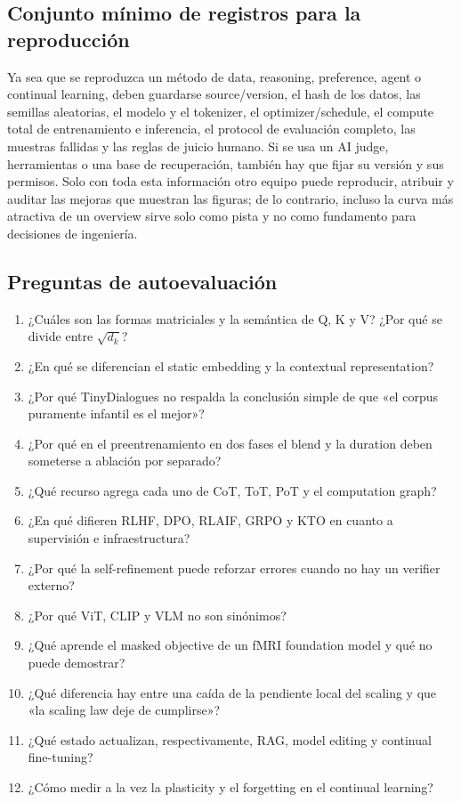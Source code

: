 \subsection{Conjunto mínimo de registros para la reproducción}

Ya sea que se reproduzca un método de data, reasoning, preference, agent o continual learning, deben guardarse source/version, el hash de los datos, las semillas aleatorias, el modelo y el tokenizer, el optimizer/schedule, el compute total de entrenamiento e inferencia, el protocol de evaluación completo, las muestras fallidas y las reglas de juicio humano. Si se usa un AI judge, herramientas o una base de recuperación, también hay que fijar su versión y sus permisos. Solo con toda esta información otro equipo puede reproducir, atribuir y auditar las mejoras que muestran las figuras; de lo contrario, incluso la curva más atractiva de un overview sirve solo como pista y no como fundamento para decisiones de ingeniería.

\subsection{Preguntas de autoevaluación}

\begin{enumerate}
  \item ¿Cuáles son las formas matriciales y la semántica de Q, K y V? ¿Por qué se divide entre $\sqrt{d_k}$?
  \item ¿En qué se diferencian el static embedding y la contextual representation?
  \item ¿Por qué TinyDialogues no respalda la conclusión simple de que «el corpus puramente infantil es el mejor»?
  \item ¿Por qué en el preentrenamiento en dos fases el blend y la duration deben someterse a ablación por separado?
  \item ¿Qué recurso agrega cada uno de CoT, ToT, PoT y el computation graph?
  \item ¿En qué difieren RLHF, DPO, RLAIF, GRPO y KTO en cuanto a supervisión e infraestructura?
  \item ¿Por qué la self-refinement puede reforzar errores cuando no hay un verifier externo?
  \item ¿Por qué ViT, CLIP y VLM no son sinónimos?
  \item ¿Qué aprende el masked objective de un fMRI foundation model y qué no puede demostrar?
  \item ¿Qué diferencia hay entre una caída de la pendiente local del scaling y que «la scaling law deje de cumplirse»?
  \item ¿Qué estado actualizan, respectivamente, RAG, model editing y continual fine-tuning?
  \item ¿Cómo medir a la vez la plasticity y el forgetting en el continual learning?
\end{enumerate}

